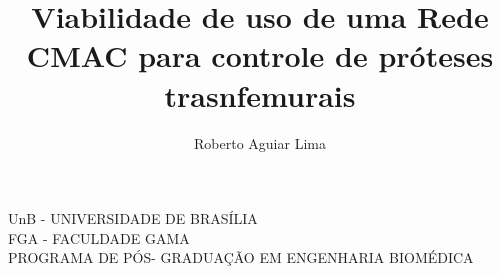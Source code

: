 \documentclass{book}
\title{Viabilidade de uso de uma Rede CMAC para controle de pr\'oteses trasnfemurais}
\author{Roberto Aguiar Lima}
\begin{document}
	UnB - UNIVERSIDADE DE BRAS\'ILIA\\
	FGA - FACULDADE GAMA\\
	PROGRAMA DE P\'OS- GRADUA\c{C}\~AO EM ENGENHARIA BIOM\'EDICA
	\maketitle
\end{document}
